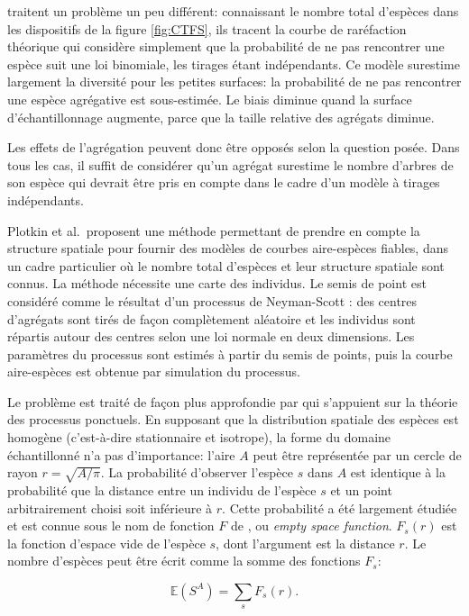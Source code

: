 \documentclass[
  11pt,
  french,
  a4paper,
  extrafontsizes,onecolumn,openright
  ]{memoir}
\begin{document}
\textcite{Plotkin2000a} traitent un problème un peu différent: connaissant le nombre total d'espèces dans les dispositifs de la figure \ref{fig:CTFS}, ils tracent la courbe de raréfaction théorique qui considère simplement que la probabilité de ne pas rencontrer une espèce suit une loi binomiale, les tirages étant indépendants.
Ce modèle surestime largement la diversité pour les petites surfaces: la probabilité de ne pas rencontrer une espèce agrégative est sous-estimée.
Le biais diminue quand la surface d'échantillonnage augmente, parce que la taille relative des agrégats diminue.

Les effets de l'agrégation peuvent donc être opposés selon la question posée.
Dans tous les cas, il suffit de considérer qu'un agrégat surestime le nombre d'arbres de son espèce qui devrait être pris en compte dans le cadre d'un modèle à tirages indépendants.

Plotkin et al.~proposent une méthode permettant de prendre en compte la structure spatiale pour fournir des modèles de courbes aire-espèces fiables, dans un cadre particulier où le nombre total d'espèces et leur structure spatiale sont connus.
La méthode nécessite une carte des individus.
Le semis de point est considéré comme le résultat d'un processus de Neyman-Scott \autocite{Neyman1958}: des centres d'agrégats sont tirés de façon complètement aléatoire et les individus sont répartis autour des centres selon une loi normale en deux dimensions.
Les paramètres du processus sont estimés à partir du semis de points, puis la courbe aire-espèces est obtenue par simulation du processus.

Le problème est traité de façon plus approfondie par \textcite{Picard2004} qui s'appuient sur la théorie des processus ponctuels.
En supposant que la distribution spatiale des espèces est homogène (c'est-à-dire stationnaire et isotrope), la forme du domaine échantillonné n'a pas d'importance: l'aire \(A\) peut être représentée par un cercle de rayon \(r=\sqrt{{A}/{\pi}}\).
La probabilité d'observer l'espèce \(s\) dans \(A\) est identique à la probabilité que la distance entre un individu de l'espèce \(s\) et un point arbitrairement choisi soit inférieure à \(r\).
Cette probabilité a été largement étudiée et est connue sous le nom de fonction \(F\) de \textcite{Diggle1983}, ou \emph{empty space function}.
\(F_s(r)\) est la fonction d'espace vide de l'espèce \(s\), dont l'argument est la distance \(r\).
Le nombre d'espèces peut être écrit comme la somme des fonctions \(F_s\):

\begin{equation}
  \label{eq:SARF}
  {\mathbb E}\left( S^A \right)  = \sum_s{F_s\left( r \right) }.
\end{equation}
\end{document}
